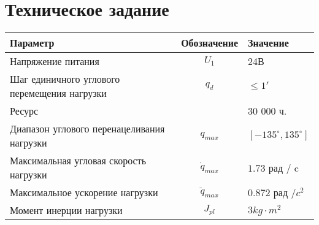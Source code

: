 \newpage
\part{Техническое задание}

\begin{tabular}{|l|c|l|}
\hline
Параметр                                    & Обозначение      & Значение \\
\hline
Напряжение питания                          & $U_1$            & 24В \\
Шаг единичного углового перемещения нагрузки& $q_d$            & $ \le 1' $ \\
Ресурс                                      &                  & 30 000 ч. \\
Диапазон углового перенацеливания нагрузки  & $q_{max}$        & $[-135^\circ, 135^\circ] $\\
Максимальная угловая скорость нагрузки      & $\dot{q}_{max}$  & $1.73$ рад / c \\
Максимальное ускорение нагрузки             & $\ddot{q}_{max}$ & $0.872$ рад /$c^2$ \\
Момент инерции нагрузки                     & $J_{pl}$         & $3 kg \cdot m^2 $\\
\hline
\end{tabular}





